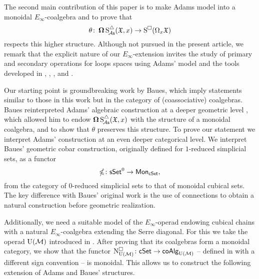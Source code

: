 The second main contribution of this paper is to make Adams model into a monoidal $E_\infty$-coalgebra and to prove that
\[
\theta \colon \operatorname{\mathbf{\Omega}} \operatorname{S^{\triangle}_{\!{\mathcal{A}\mathsf{s}}}}(\mathfrak{X}, x) \to \operatorname{S^{\square}}(\Omega_x \mathfrak{X})
\]
respects this higher structure.
Although not pursued in the present article, we remark that the explicit nature of our $E_\infty$-extension invites the study of primary and secondary operations for loops spaces using Adams' model and the tools developed in \cite{medina2021may_st}, \cite{medina2020cartan}, \cite{medina2021adem}, and \cite{medina2021comch}.

Our starting point is groundbreaking work by Baues, which imply statements similar to those in this work but in the category of (coassociative) coalgebras. Baues reinterpreted Adams' algebraic construction at a deeper geometric level \cite{baues1998hopf}, which allowed him to endow $\operatorname{\mathbf{\Omega}} \operatorname{S^{\triangle}_{\!{\mathcal{A}\mathsf{s}}}}(\mathfrak{X}, x)$ with the structure of a monoidal coalgebra, and to show that $\theta$ preserves this structure.
To prove our statement we interpret Adams' construction at an even deeper categorical level.
We interpret Baues' geometric cobar construction, originally defined for $1$-reduced simplicial sets, as a functor
\begin{equation*}
	\operatorname{\mathbb{\Omega}} \colon \mathsf{sSet}^0 \to \mathsf{Mon}_{\mathsf{cSet}},
\end{equation*}
from the category of $0$-reduced simplicial sets to that of monoidal cubical sets.
The key difference with Baues' original work is the use of connections to obtain a natural construction before geometric realization.

Additionally, we need a suitable model of the $E_\infty$-operad endowing cubical chains with a natural $E_\infty$-coalgebra extending the Serre diagonal.
For this we take the operad ${\operatorname{U}(\mathcal{M})}$ introduced in \cite{medina2020prop1}.
After proving that its coalgebras form a monoidal category, we show that the functor $\operatorname{N^{\square}_{{\operatorname{U}(\mathcal{M})}}} \colon \mathsf{cSet} \to \mathsf{coAlg}_{\operatorname{U}(\mathcal{M})}$ -- defined in \cite{medina2022cube_einfty} with a different sign convention -- is monoidal.
This allows us to construct the following extension of Adams and Baues' structures.


